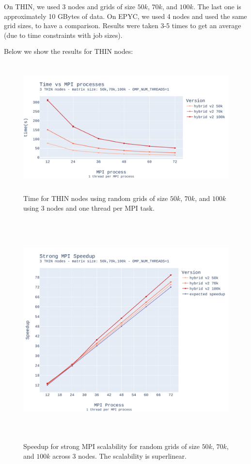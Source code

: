 \documentclass{report}
\begin{document}
On THIN, we used 3 nodes and grids of size $50k$, $70k$, and $100k$. The last 
one is approximately 10 GBytes of data. On EPYC, we used 4 nodes and used the 
same grid sizes, to have a comparison. Results were taken 3-5 times to get an 
average (due to time constraints with job sizes).

Below we show the results for THIN nodes:

\begin{figure}[H]
\centering
\includegraphics[width=14cm, height=7cm]{./images/strong_MPI_thin_hybrid.pdf}
\caption{\label{fig:strongmpithinhybrid} Time for THIN nodes using random grids 
of size $50k$, $70k$, and $100k$ using 3 nodes and one thread per MPI task. }
\end{figure}

\begin{figure}[H]
\centering
\includegraphics[width=14cm, height=12cm]{./images/strong_MPI_thin_hybrid_speedup.pdf}
\caption{\label{fig:strongmpithinhybridspeedup} Speedup for strong MPI scalability 
for random grids of size $50k$, $70k$, and $100k$ across 3 nodes. The scalability 
is superlinear.}
\end{figure}
\end{document}
